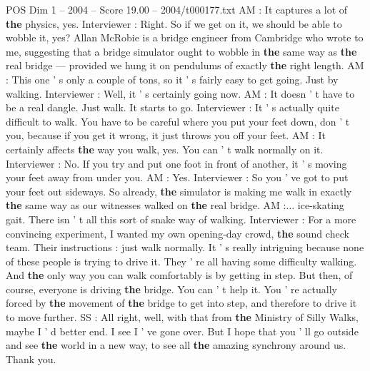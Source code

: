 \begin{textsample}{POS Dim 1 – 2004 – Score 19.00 – 2004/t000177.txt}
AM : It captures a lot of \textbf{the} physics, yes.
Interviewer : Right.
So if we get on it, we should be able to wobble it, yes?
Allan McRobie is a bridge engineer from Cambridge who wrote to me, suggesting that a bridge simulator ought to wobble in \textbf{the} same way as \textbf{the} real bridge — provided we hung it on pendulums of exactly \textbf{the} right length.
AM : This one ' s only a couple of tons, so it ' s fairly easy to get going.
Just by walking.
Interviewer : Well, it ' s certainly going now.
AM : It doesn ' t have to be a real dangle.
Just walk.
It starts to go.
Interviewer : It ' s actually quite difficult to walk.
You have to be careful where you put your feet down, don ' t you, because if you get it wrong, it just throws you off your feet.
AM : It certainly affects \textbf{the} way you walk, yes.
You can ' t walk normally on it.
Interviewer : No.
If you try and put one foot in front of another, it ' s moving your feet away from under you.
AM : Yes.
Interviewer : So you ' ve got to put your feet out sideways.
So already, \textbf{the} simulator is making me walk in exactly \textbf{the} same way as our witnesses walked on \textbf{the} real bridge.
AM :... ice-skating gait.
There isn ' t all this sort of snake way of walking.
Interviewer : For a more convincing experiment, I wanted my own opening-day crowd, \textbf{the} sound check team.
Their instructions : just walk normally.
It ' s really intriguing because none of these people is trying to drive it.
They ' re all having some difficulty walking.
And \textbf{the} only way you can walk comfortably is by getting in step.
But then, of course, everyone is driving \textbf{the} bridge.
You can ' t help it.
You ' re actually forced by \textbf{the} movement of \textbf{the} bridge to get into step, and therefore to drive it to move further.
SS : All right, well, with that from \textbf{the} Ministry of Silly Walks, maybe I ' d better end.
I see I ' ve gone over.
But I hope that you ' ll go outside and see \textbf{the} world in a new way, to see all \textbf{the} amazing synchrony around us.
Thank you.

\end{textsample}
